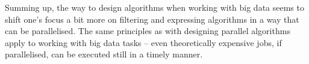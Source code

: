 Summing up, the way to design algorithms when working with big data seems to shift one's focus a bit more on filtering and expressing algorithms in a way that can be parallelised. The same principles as with designing parallel algorithms apply to working with big data tasks -- even theoretically expensive jobs, if parallelised, can be executed still in a timely manner.


%
%
%
